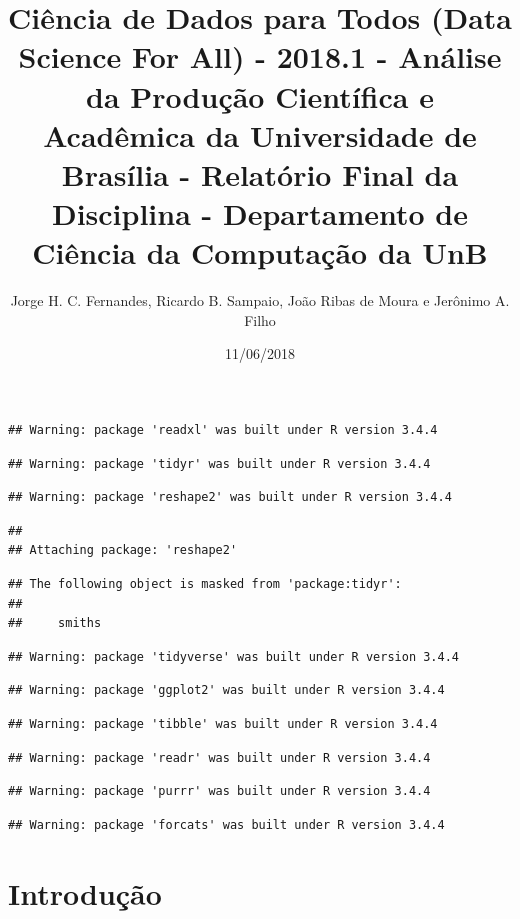 \documentclass[]{article}
\title{Ciência de Dados para Todos (Data Science For All) - 2018.1 - Análise da
Produção Científica e Acadêmica da Universidade de Brasília - Relatório
Final da Disciplina - Departamento de Ciência da Computação da UnB}
\author{Jorge H. C. Fernandes, Ricardo B. Sampaio, João Ribas de Moura e
Jerônimo A. Filho}
\date{11/06/2018}
\begin{document}
\maketitle

\begin{verbatim}
## Warning: package 'readxl' was built under R version 3.4.4
\end{verbatim}

\begin{verbatim}
## Warning: package 'tidyr' was built under R version 3.4.4
\end{verbatim}

\begin{verbatim}
## Warning: package 'reshape2' was built under R version 3.4.4
\end{verbatim}

\begin{verbatim}
## 
## Attaching package: 'reshape2'
\end{verbatim}

\begin{verbatim}
## The following object is masked from 'package:tidyr':
## 
##     smiths
\end{verbatim}

\begin{verbatim}
## Warning: package 'tidyverse' was built under R version 3.4.4
\end{verbatim}

\begin{verbatim}
## Warning: package 'ggplot2' was built under R version 3.4.4
\end{verbatim}

\begin{verbatim}
## Warning: package 'tibble' was built under R version 3.4.4
\end{verbatim}

\begin{verbatim}
## Warning: package 'readr' was built under R version 3.4.4
\end{verbatim}

\begin{verbatim}
## Warning: package 'purrr' was built under R version 3.4.4
\end{verbatim}

\begin{verbatim}
## Warning: package 'forcats' was built under R version 3.4.4
\end{verbatim}

\section{Introdução}\label{introducao}
\end{document}
